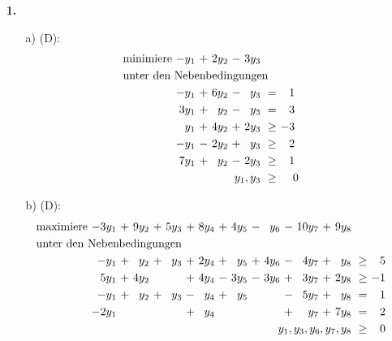 \documentclass [a4paper,11pt]{article}
\author{\authorinfotitle}
\title{\titleinfo}
\date{\today}
\begin{document}
\maketitle
    \begin{enumerate}
        \item[\textbf{1.}]
        \begin{enumerate}
        \item[a)]
            (D):
            \begin{align*}
            \begin{alignedat}{6}
            & \text{minimiere } & -y_1 &\ + &\ 2y_2 &\ - &\ 3y_3 & & \\
            & \rlap{unter den Nebenbedingungen} & & & & & & & \\
            && -y_1 &\ + &\ 6y_2 &\ - &\  y_3 &\   =  &\  1\ \\
            && 3y_1 &\ + &\  y_2 &\ - &\  y_3 &\   =  &\  3\ \\
            &&  y_1 &\ + &\ 4y_2 &\ + &\ 2y_3 &\ \geq &\ -3\ \\
            && -y_1 &\ - &\ 2y_2 &\ + &\  y_3 &\ \geq &\  2\ \\
            && 7y_1 &\ + &\  y_2 &\ - &\ 2y_3 &\ \geq &\  1\ \\
            && & & & & \llap{$y_1,y_3$} &\ \geq &\ 0
            \end{alignedat}
            \end{align*}
        \item[b)]
            (D):
            \begin{align*}
            \begin{alignedat}{10}
            & \text{maximiere } & -3y_1 &\ + &\ 9y_2 &\ + &\ 5y_3 &\ + &\ 8y_4 &\ + &\ 4y_5 &\ - &\ y_6 &\ - &\ 10y_7 &\ + &\ 9y_8 & & \\
            & \rlap{unter den Nebenbedingungen} & & & & & & & & & & & & & & & & & \\
            &&  -y_1 &\ + &\  y_2 &\ + &\  y_3 &\ + &\ 2y_4 &\ + &\  y_5 &\ + &\ 4y_6 &\ - &\  4y_7 &\ + &\  y_8 &\ \geq &\  5 \\
            &&  5y_1 &\ + &\ 4y_2 &    &       &\ + &\ 4y_4 &\ - &\ 3y_5 &\ - &\ 3y_6 &\ + &\  3y_7 &\ + &\ 2y_8 &\ \geq &\ -1 \\
            &&  -y_1 &\ + &\  y_2 &\ + &\  y_3 &\ - &\  y_4 &\ + &\  y_5 &    &       &\ - &\  5y_7 &\ + &\  y_8 &\   =  &\ 1 \\
            && -2y_1 &    &       &    &       &\ + &\  y_4 &    &       &    &       &\ + &\   y_7 &\ + &\ 7y_8 &\   =  &\ 2 \\
            && & & & & & & & & & & & & & & \llap{$y_1,y_3,y_6,y_7,y_8$} &\ \geq &\ 0
            \end{alignedat}
            \end{align*}


\end{enumerate}
\end{enumerate}
\end{document}
